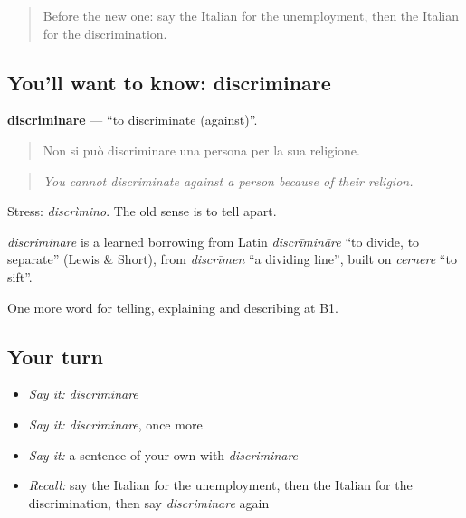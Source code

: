 \label{lesson:IT-C366-discriminare}



\begin{quote}
Before the new one: say the Italian for the unemployment, then the Italian for the discrimination.
\end{quote}

\subsection*{You'll want to know: discriminare}
\textbf{discriminare} — \textquotedblleft{}to discriminate (against)\textquotedblright{}.

\begin{quote}
Non si può discriminare una persona per la sua religione.
\end{quote}

\begin{quote}
\emph{You cannot discriminate against a person because of their religion.}
\end{quote}

Stress: \emph{discrìmino}. The old sense is to tell apart.

\begin{cousinweb}
\emph{discriminare} is a learned borrowing from Latin \emph{discrīmināre} \textquotedblleft{}to divide, to separate\textquotedblright{} (Lewis \& Short), from \emph{discrīmen} \textquotedblleft{}a dividing line\textquotedblright{}, built on \emph{cernere} \textquotedblleft{}to sift\textquotedblright{}.
\end{cousinweb}

\begin{grammarlens}[title={What you've built}]
One more word for telling, explaining and describing at B1.
\end{grammarlens}

\subsection*{Your turn}
\begin{itemize}
\raggedright
  \item \emph{Say it:} \emph{discriminare}
  \item \emph{Say it:} \emph{discriminare}, once more
  \item \emph{Say it:} a sentence of your own with \emph{discriminare}
  \item \emph{Recall:} say the Italian for the unemployment, then the Italian for the discrimination, then say \emph{discriminare} again
\end{itemize}

